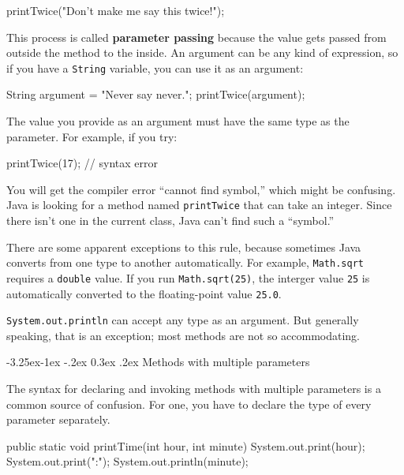 \documentclass[12pt]{book}
\makeatletter
\theoremstyle{exercise}
\newcommand{\java}[1]{\verb"#1"}
\renewcommand\subsection{\@startsection{subsection}{2}{\z@}%
    {-3.25ex\@plus -1ex \@minus -.2ex}%
    {0.3ex \@plus .2ex}%
    {\normalfont\large\bfseries}}
\newcommand{\java}[1]{\lstinline{#1}} %
\makeatother
\begin{document}
\begin{code}
    printTwice("Don't make me say this twice!");
\end{code}


This process is called {\bf parameter passing} because the value gets passed from outside the method to the inside.
An argument can be any kind of expression, so if you have a \java{String} variable, you can use it as an argument:

\begin{code}
    String argument = "Never say never.";
    printTwice(argument);
\end{code}

The value you provide as an argument must have the same type as the parameter.
For example, if you try:

\begin{code}
    printTwice(17);  // syntax error
\end{code}

You will get the compiler error ``cannot find symbol,'' which might be confusing.
Java is looking for a method named \java{printTwice} that can take an integer.
Since there isn't one in the current class, Java can't find such a ``symbol.''

There are some apparent exceptions to this rule, because sometimes Java converts from one type to another automatically.
For example, \java{Math.sqrt} requires a \java{double} value.
If you run \java{Math.sqrt(25)}, the interger value \java{25} is automatically converted to the floating-point value \java{25.0}.

\java{System.out.println} can accept any type as an argument.
But generally speaking, that is an exception; most methods are not so accommodating.

\subsection{Methods with multiple parameters}
\label{time}


The syntax for declaring and invoking methods with multiple parameters is a common source of confusion.
For one, you have to declare the type of every parameter separately.

\begin{code}
    public static void printTime(int hour, int minute) {
        System.out.print(hour);
        System.out.print(":");
        System.out.println(minute);
    }
\end{code}
\end{document}
